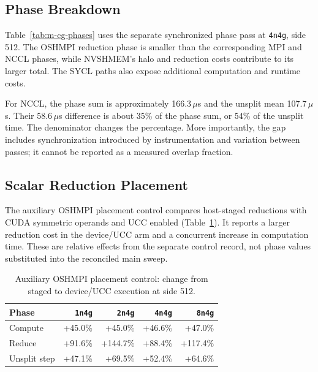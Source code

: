\subsection{Phase Breakdown}

Table~\ref{tab:m-cg-phases} uses the separate synchronized phase pass at \texttt{4n4g}, side 512. The OSHMPI reduction phase is smaller than the corresponding MPI and NCCL phases, while NVSHMEM's halo and reduction costs contribute to its larger total. The SYCL paths also expose additional computation and runtime costs.

\begin{table}[htbp]
\centering
\caption[\texttt{cg\_step} phase costs on \texttt{4n4g}]{Archived mean \texttt{cg\_step} phase costs on \texttt{4n4g}, side 512, in \,$\mu$s. Step is the unsplit mean; gap is phase sum minus step.}
\label{tab:m-cg-phases}
\scriptsize

\end{table}

For NCCL, the phase sum is approximately 166.3\,$\mu$s and the unsplit mean 107.7\,$\mu$s. Their 58.6\,$\mu$s difference is about 35\% of the phase sum, or 54\% of the unsplit time. The denominator changes the percentage. More importantly, the gap includes synchronization introduced by instrumentation and variation between passes; it cannot be reported as a measured overlap fraction.

\subsection{Scalar Reduction Placement}

The auxiliary OSHMPI placement control compares host-staged reductions with CUDA symmetric operands and UCC enabled (Table~\ref{tab:m-oshmpi-reduce-placement}). It reports a larger reduction cost in the device/UCC arm and a concurrent increase in computation time. These are relative effects from the separate control record, not phase values substituted into the reconciled main sweep.

\begin{table}[htbp]
\centering
\caption[OSHMPI scalar-reduction placement control]{Auxiliary OSHMPI placement control: change from staged to device/UCC execution at side 512.}
\label{tab:m-oshmpi-reduce-placement}
\footnotesize
\begin{tabular}{lrrrr}
\toprule
Phase & \texttt{1n4g} & \texttt{2n4g} & \texttt{4n4g} & \texttt{8n4g}\\
\midrule
Compute & +45.0\% & +45.0\% & +46.6\% & +47.0\%\\
Reduce & +91.6\% & +144.7\% & +88.4\% & +117.4\%\\
Unsplit step & +47.1\% & +69.5\% & +52.4\% & +64.6\%\\
\bottomrule
\end{tabular}
\end{table}

